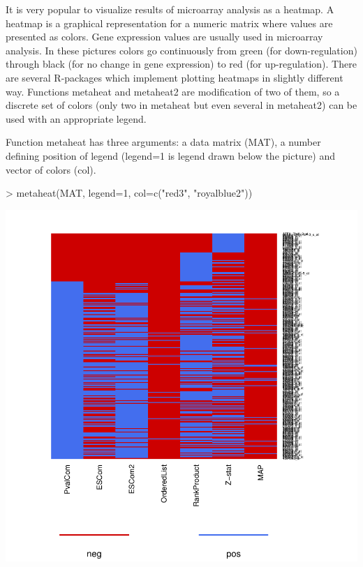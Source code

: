 \documentclass[a4paper]{report}
\begin{document}
It is very popular to visualize results of microarray analysis as a heatmap. A heatmap is a graphical representation for a numeric matrix where values are presented as colors. Gene expression values are usually used in microarray analysis. In these pictures colors go continuously from green (for down-regulation) through black (for no change in gene expression) to red (for up-regulation). There are several R-packages which implement plotting heatmaps in slightly different way. Functions {\ttfamily metaheat} and {\ttfamily metaheat2} are modification of two of them, so a discrete set of colors (only two in {\ttfamily metaheat} but even several in {\ttfamily metaheat2}) can be used with an appropriate legend.\par
Function {\ttfamily metaheat} has three arguments: a data matrix ({\ttfamily MAT}), a number defining position of legend ({\ttfamily legend=1} is legend drawn below the picture) and vector of colors ({\ttfamily col}). 
\begin{center}
\begin{Schunk}
\begin{Sinput}
> metaheat(MAT, legend=1, col=c("red3", "royalblue2"))
\end{Sinput}
\end{Schunk}
\includegraphics{MAMA_full-068}
\end{center}                  
\end{document}
